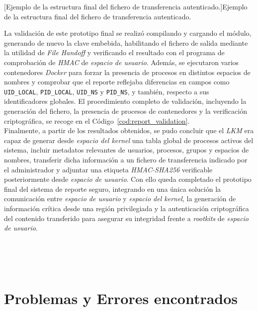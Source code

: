 \captionsetup{type=code,justification=centering,singlelinecheck=false}
[Ejemplo de la estructura final del fichero de transferencia autenticado.]{Ejemplo de la estructura final del fichero de transferencia autenticado.}
\label{cod:handoff_file_structure}
\vspace{\baselineskip}

La validación de este prototipo final se realizó compilando y cargando el módulo, generando de nuevo la clave embebida, habilitando el fichero de salida mediante la utilidad de \textit{File Handoff} y verificando el resultado con el programa de comprobación de \textit{HMAC} de \textit{espacio de usuario}.
Además, se ejecutaron varios contenedores \textit{Docker} para forzar la presencia de procesos en distintos espacios de nombres y comprobar que el reporte reflejaba diferencias en campos como \texttt{UID\_LOCAL}, \texttt{PID\_LOCAL}, \texttt{UID\_NS} y \texttt{PID\_NS}, y también, respecto a sus identificadores globales.
El procedimiento completo de validación, incluyendo la generación del fichero, la presencia de procesos de contenedores y la verificación criptográfica, se recoge en el Código~\ref{cod:report_validation}.\\

Finalmente, a partir de los resultados obtenidos, se pudo concluir que el \textit{LKM} era capaz de generar desde \textit{espacio del kernel} una tabla global de procesos activos del sistema, incluir metadatos relevantes de usuarios, procesos, grupos y espacios de nombres, transferir dicha información a un fichero de transferencia indicado por el administrador y adjuntar una etiqueta \textit{HMAC-SHA256} verificable posteriormente desde \textit{espacio de usuario}.
Con ello queda completado el prototipo final del sistema de reporte seguro, integrando en una única solución la comunicación entre \textit{espacio de usuario} y \textit{espacio del kernel}, la generación de información crítica desde una región privilegiada y la autenticación criptográfica del contenido transferido para asegurar su integridad frente a \textit{rootkits} de \textit{espacio de usuario}.\\\\

\

\

\section{Problemas y Errores encontrados}
\label{sec:problemas-errores}

